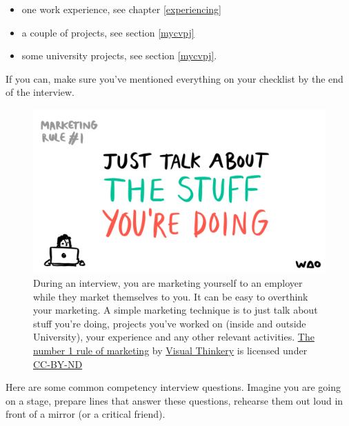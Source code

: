 \documentclass[
]{book}
\providecommand{\tightlist}{%
  \setlength{\itemsep}{0pt}\setlength{\parskip}{0pt}}
\begin{document}
\begin{itemize}
\tightlist
\item
  one work experience, see chapter \ref{experiencing}
\item
  a couple of projects, see section \ref{mycvpj}
\item
  some university projects, see section \ref{mycvpj}.
\end{itemize}

If you can, make sure you've mentioned everything on your checklist by the end of the interview.

\begin{figure}

{\centering \includegraphics[width=0.99\linewidth]{images/Marketing-rule-No1} 

}

\caption{During an interview, you are marketing yourself to an employer while they market themselves to you. It can be easy to overthink your marketing. A simple marketing technique is to just talk about stuff you're doing, projects you've worked on (inside and outside University), your experience and any other relevant activities. \href{https://bryanmmathers.com/the-1-rule-of-marketing/}{The number 1 rule of marketing} by \href{https://visualthinkery.com/}{Visual Thinkery} is licensed under \href{https://creativecommons.org/licenses/by-nd/4.0/}{CC-BY-ND}}\label{fig:overthinking-fig}
\end{figure}



Here are some common competency interview questions. Imagine you are going on a stage, prepare lines that answer these questions, rehearse them out loud in front of a mirror (or a critical friend).
\end{document}
